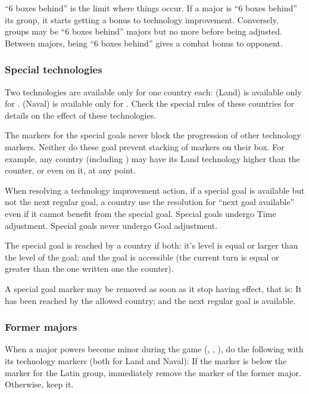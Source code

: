\begin{playtip}
  ``6 boxes behind'' is the limit where things occur. If a major is ``6 boxes
  behind'' its group, it starts getting a bonus to technology
  improvement. Conversely, groups may be ``6 boxes behind'' majors but no more
  before being adjusted. Between majors, being ``6 boxes behind'' gives a
  combat bonus to opponent.
\end{playtip}


\subsubsection{Special technologies}
\aparag Two technologies are available only for one country each:
\bparag \TTER (Land) is available only for \HIS.
\bparag \TVGA (Naval) is available only for \VEN.
\bparag Check the special rules of these countries for details on the effect
of these technologies.

\aparag The markers for the special goals never block the progression of other
technology markers.
\bparag Neither do these goal prevent stacking of markers on their box.
\bparag For example, any country (including \HIS) may have its Land technology
higher than the \TTER counter, or even on it, at any point.

\aparag When resolving a technology improvement action, if a special goal is
available but not the next regular goal, a country use the resolution for
``next goal available'' even if it cannot benefit from the special goal.
\bparag Special goals undergo Time adjustment.
\bparag Special goals never undergo Goal adjustment.

\aparag The special goal is reached by a country if both:
\bparag it's level is equal or larger than the level of the goal;
\bparag and the goal is accessible (the current turn is equal or greater than
the one written one the counter).

\aparag A special goal marker may be removed as soon as it stop having effect,
that is:
\bparag It has been reached by the allowed country;
\bparag and the next regular goal is available.


\subsubsection{Former majors}
\aparag When a major powers become minor during the game (\POR, \VEN, \POL),
do the following with its technology markers (both for Land and Naval):
\bparag If the marker is below the marker for the Latin group, immediately
remove the marker of the former major.
\bparag Otherwise, keep it.

